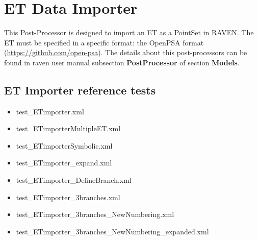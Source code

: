 \section{ET Data Importer}
\label{sec:ETdataImporter}

This Post-Processor is designed to import an ET as a PointSet in RAVEN.
The ET must be specified in a specific format: the OpenPSA format (\href{<url>}{https://github.com/open-psa}). 
The details about this post-processors can be found in raven user manual subsection \textbf{PostProcessor}
of section \textbf{Models}.

\subsection{ET Importer reference tests}
\begin{itemize}
	\item test\_ETimporter.xml
	\item test\_ETimporterMultipleET.xml
	\item test\_ETimporterSymbolic.xml
	\item test\_ETimporter\_expand.xml
	\item test\_ETimporter\_DefineBranch.xml
	\item test\_ETimporter\_3branches.xml
	\item test\_ETimporter\_3branches\_NewNumbering.xml
	\item test\_ETimporter\_3branches\_NewNumbering\_expanded.xml
\end{itemize}
